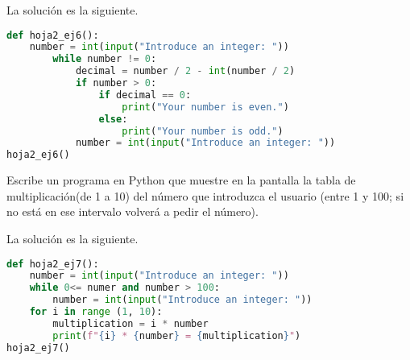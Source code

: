 \documentclass{article}
\begin{document}
\begin{sol}
La solución es la siguiente.
\begin{lstlisting}[language = Python]
def hoja2_ej6():
    number = int(input("Introduce an integer: "))
        while number != 0:
            decimal = number / 2 - int(number / 2)
            if number > 0:
                if decimal == 0:
                    print("Your number is even.")
                else:
                    print("Your number is odd.")
            number = int(input("Introduce an integer: "))
hoja2_ej6()
\end{lstlisting}
\end{sol}

\begin{ej}
Escribe un programa en Python que muestre en la pantalla la tabla de multiplicación(de 1 a 10) del número que introduzca el usuario (entre 1 y 100; si no está en ese intervalo volverá a pedir el número).
\end{ej}

\begin{sol}
La solución es la siguiente.
\begin{lstlisting}[language = Python]
def hoja2_ej7():
    number = int(input("Introduce an integer: "))
    while 0<= numer and number > 100:
        number = int(input("Introduce an integer: "))
    for i in range (1, 10):
        multiplication = i * number
        print(f"{i} * {number} = {multiplication}")
hoja2_ej7()
\end{lstlisting}
\end{sol}
\end{document}

